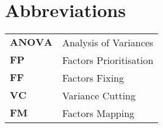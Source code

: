 
\section*{Abbreviations}

\hspace{20cm}

\begin{table}[H]

	\begin{tabular}{ll}
		\toprule
		$\textbf{ANOVA}$	& Analysis of Variances \\

		$\textbf{FP}$		& Factors Prioritisation \\

		$\textbf{FF}$		& Factors Fixing \\

		$\textbf{VC}$		& Variance Cutting \\

		$\textbf{FM}$		& Factors Mapping \\

		\bottomrule
	\end{tabular}
\end{table}